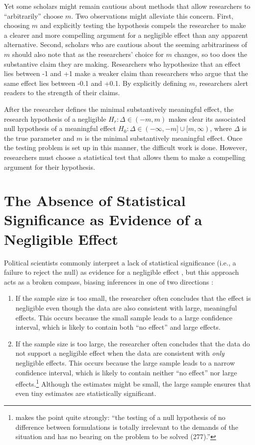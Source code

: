 \documentclass[12pt]{article}
\begin{document}
Yet some scholars might remain cautious about methods that allow researchers to ``arbitrarily'' choose $m$. Two observations might alleviate this concern. First, choosing $m$ and explicitly testing the hypothesis compels the researcher to make a clearer and more compelling argument for a negligible effect than any apparent alternative. Second, scholars who are cautious about the seeming arbitrariness of $m$ should also note that as the researchers' choice for $m$ changes, so too does the substantive claim they are making. Researchers who hypothesize that an effect lies between -1 and +1 make a weaker claim than researchers who argue that the same effect lies between -0.1 and +0.1. By explicitly defining $m$, researchers alert readers to the strength of their claims.  

After the researcher defines the minimal substantively meaningful effect, the research hypothesis  of a negligible $H_r: \Delta \in (-m, m)$ makes clear its associated null hypothesis of a meaningful effect $H_0: \Delta \in (-\infty, -m] \cup [m, \infty)$,
where $\Delta$ is the true parameter and $m$ is the minimal substantively meaningful effect. Once the testing problem is set up in this manner, the difficult work is done. However, researchers must choose a statistical test that allows them to make a compelling argument for their hypothesis.

\section*{The Absence of Statistical Significance as Evidence of a Negligible Effect}

Political scientists commonly interpret a lack of statistical significance (i.e., a failure to reject the null) as evidence for a negligible effect \citep{Gill1999}, but this approach acts as a broken compass, biasing inferences in one of two directions \citep{Westlake1979}:

\begin{enumerate}
\item If the sample size is too small, the researcher often concludes that the effect is negligible even though the data are also consistent with large, meaningful effects. This occurs because the small sample leads to a large confidence interval, which is likely to contain both ``no effect'' and large effects.
\item If the sample size is too large, the researcher often concludes that the data do not support a negligible effect when the data are consistent with \textit{only}  negligible effects. This occurs because the large sample leads to a narrow confidence interval, which is likely to contain neither ``no effect'' nor large effects.\footnote{\cite{Westlake1979} makes the point quite strongly: ``the testing of a null hypothesis of no difference between formulations is totally irrelevant to the demands of the situation and has no bearing on the problem to be solved (277).''} Although the estimates might be small, the large sample ensures that even tiny estimates are statistically significant.
\end{enumerate}
\end{document}
